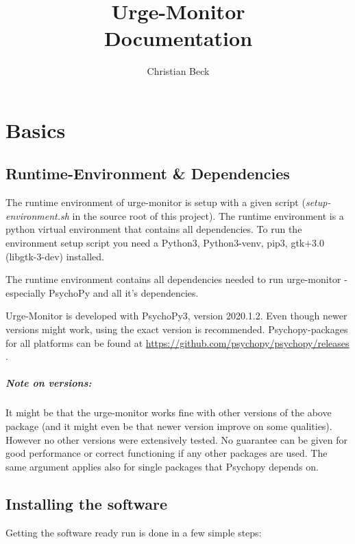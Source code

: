 \documentclass[12pt,a4paper]{book}
\title{Urge-Monitor\\Documentation}
\author{Christian Beck}
\begin{document}
\maketitle

\tableofcontents

\chapter{Basics}

\section{Runtime-Environment \& Dependencies}

The runtime environment of urge-monitor is setup with a given script (\textit{setup-environment.sh} in the source root of this project). The runtime environment is a python virtual environment that contains all dependencies. To run the environment setup script you need a Python3, Python3-venv, pip3, gtk+3.0 (libgtk-3-dev) installed.

The runtime environment contains all dependencies needed to run urge-monitor - especially PsychoPy and all it's dependencies.

Urge-Monitor is developed with PsychoPy3, version 2020.1.2. Even though newer versions might work, using the exact version is recommended. Psychopy-packages for all platforms can be found at \url{https://github.com/psychopy/psychopy/releases} .

\paragraph{Note on versions:} It might be that the urge-monitor works fine with other versions of the above package (and it might even be that newer version improve on some qualities). However no other versions were extensively tested. No guarantee can be given for good performance or correct functioning if any other packages are used. The same argument applies also for single packages that Psychopy depends on.

\section{Installing the software}

Getting the software ready run is done in a few simple steps:
\end{document}
